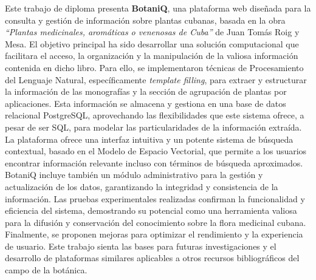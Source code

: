 \begin{resumen}
	Este trabajo de diploma presenta \textbf{BotaniQ}, una plataforma web diseñada 
	para la consulta y gestión de información sobre plantas cubanas, 
	basada en la obra \textit{``Plantas medicinales, aromáticas o venenosas de Cuba''} 
	de Juan Tomás Roig y Mesa. El objetivo principal ha sido desarrollar una 
	solución computacional que facilitara el acceso, la organización y la 
	manipulación de la valiosa información contenida en dicho libro. 
	Para ello, se implementaron técnicas de Procesamiento del Lenguaje Natural, 
	específicamente \textit{template filling}, para extraer y estructurar la 
	información de las monografías y la sección de agrupación de plantas por 
	aplicaciones. Esta información se almacena y gestiona en una base de datos 
	relacional PostgreSQL, aprovechando las flexibilidades que este sistema ofrece, 
	a pesar de ser SQL, para modelar las particularidades de la información extraída. 
	La plataforma ofrece una interfaz intuitiva y un potente sistema de búsqueda contextual, 
	basado en el Modelo de Espacio Vectorial, que permite a los usuarios encontrar 
	información relevante incluso con términos de búsqueda aproximados. BotaniQ 
	incluye también un módulo administrativo para la gestión y actualización de 
	los datos, garantizando la integridad y consistencia de la información. 
	Las pruebas experimentales realizadas confirman la funcionalidad y eficiencia 
	del sistema, demostrando su potencial como una herramienta valiosa para la 
	difusión y conservación del conocimiento sobre la flora medicinal cubana. 
	Finalmente, se proponen mejoras para optimizar el rendimiento y la experiencia 
	de usuario. Este trabajo sienta las bases para futuras investigaciones y 
	el desarrollo de plataformas similares aplicables a otros recursos bibliográficos 
	del campo de la botánica.
\end{resumen}

